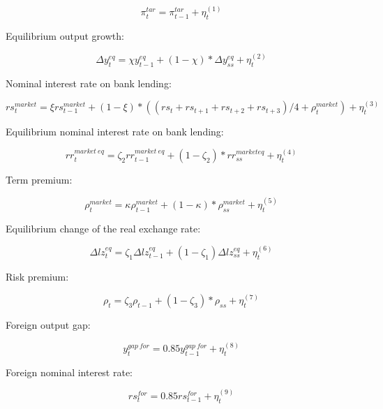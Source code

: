 \documentclass[12pt]{article}
\begin{document}
\begin{equation}
	\pi_t^{tar} = \pi_{t-1}^{tar} + \eta_t^{(1)}
\end{equation}

Equilibrium output growth:

\begin{equation}
	\Delta y^{eq}_t = \chi y^{eq}_{t-1} + (1-\chi)*\Delta y^{eq}_{ss} + \eta_t^{(2)}
\end{equation}

Nominal interest rate on bank lending:

\begin{equation}
	rs^{market}_t = \xi rs^{market}_{t-1}  + (1-\xi) * ((rs_t+rs_{t+1}+rs_{t+2}+rs_{t+3})/4+\rho_t^{market}) + \eta_t^{(3)}
\end{equation}

Equilibrium nominal interest rate on bank lending:

\begin{equation}
rr^{market~eq}_t = \zeta_2 rr^{market~eq}_{t-1}  + (1-\zeta_2) * rr^{market eq}_{ss} + \eta_t^{(4)}
\end{equation}

Term premium:

\begin{equation}
	\rho^{market}_t = \kappa \rho^{market}_{t-1}  + (1-\kappa) * \rho^{market}_{ss} + \eta_t^{(5)}
\end{equation}

Equilibrium change of the real exchange rate:

\begin{equation}
	\Delta lz_t^{eq} = \zeta_1 \Delta lz_{t-1}^{eq} + (1-\zeta_1) \Delta lz_{ss}^{eq} + \eta_t^{(6)}
\end{equation}

Risk premium:

\begin{equation}
	\rho_t = \zeta_3 \rho_{t-1}  + (1-\zeta_3) * \rho_{ss} + \eta_t^{(7)} 
\end{equation}

Foreign output gap:

\begin{equation}
	y^{gap~for}_t = 0.85 y^{gap~for}_{t-1} + \eta_t^{(8)}
\end{equation}

Foreign nominal interest rate:

\begin{equation}
	rs^{for}_t = 0.85 rs^{for}_{t-1} + \eta_t^{(9)}
\end{equation}
\end{document}
